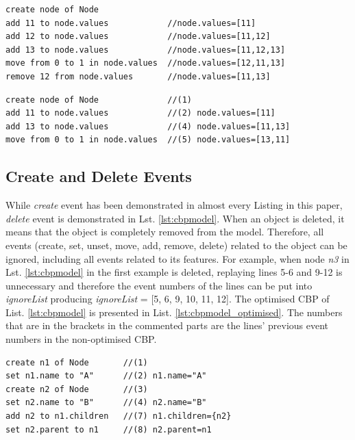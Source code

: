 \documentclass{llncs}
\begin{document}
\begin{lstlisting}[style=eol,caption={The CBP representation of attribute \emph{values}'s move event.},label=lst:move_attribute_example]
create node of Node
add 11 to node.values            //node.values=[11] 
add 12 to node.values            //node.values=[11,12] 
add 13 to node.values            //node.values=[11,12,13] 
move from 0 to 1 in node.values  //node.values=[12,11,13]  
remove 12 from node.values       //node.values=[11,13] 
\end{lstlisting}

\begin{lstlisting}[style=eol,caption={The optimised CBP representation of attribute \emph{values}'s event.},label=lst:move_attribute_example_error]
create node of Node              //(1)  
add 11 to node.values            //(2) node.values=[11] 
add 13 to node.values            //(4) node.values=[11,13] 
move from 0 to 1 in node.values  //(5) node.values=[13,11]   
\end{lstlisting}

\subsection{Create and Delete Events}
\label{subsec:create_and_delete_operations}
While \emph{create} event has been demonstrated in almost every Listing in this paper, \emph{delete} event is demonstrated in Lst. \ref{lst:cbpmodel}. When an object is deleted, it means that the object is completely removed from the model. Therefore, all events (create, set, unset, move, add, remove, delete) related to the object can be ignored, including all events related to its features. For example, when node \emph{n3} in Lst. \ref{lst:cbpmodel}  in the first example is deleted, replaying lines 5-6 and 9-12 is unnecessary and therefore the event numbers of the lines can be put into \emph{ignoreList} producing \emph{ignoreList} = [5, 6, 9, 10, 11, 12]. The optimised CBP of List. \ref{lst:cbpmodel} is presented in List. \ref{lst:cbpmodel_optimised}. The numbers that are in the brackets in the commented parts are the lines' previous event numbers in the non-optimised CBP.  

\begin{lstlisting}[style=eol,caption={Change-based representation of the model of Figure \ref{fig:initial_model} after removal of node \emph{n5}.},label=lst:cbpmodel_optimised]
create n1 of Node       //(1)
set n1.name to "A"      //(2) n1.name="A"
create n2 of Node       //(3)
set n2.name to "B"      //(4) n2.name="B"
add n2 to n1.children   //(7) n1.children={n2}
set n2.parent to n1     //(8) n2.parent=n1
\end{lstlisting}
\end{document}
